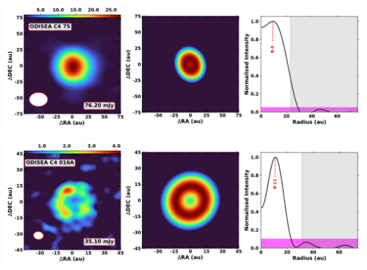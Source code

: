 \vspace{0pt}
\begin{minipage}{.49\textwidth}
	 \centering
	 	 \hrulesep
	 	 \includegraphics[width=1\linewidth]{pdf/4+II/057_odisea_c4_75_cutout.pdf}
\end{minipage}%
\vrulesep
\begin{minipage}{.49\textwidth}
	 \centering
	 	 \hrulesep
	 	 \includegraphics[width=1\linewidth]{pdf/4+II/042_odisea_c4_016a_cutout.pdf}
\end{minipage}%
\vspace{0pt}
\noindent{}%
\vspace{0.8cm}